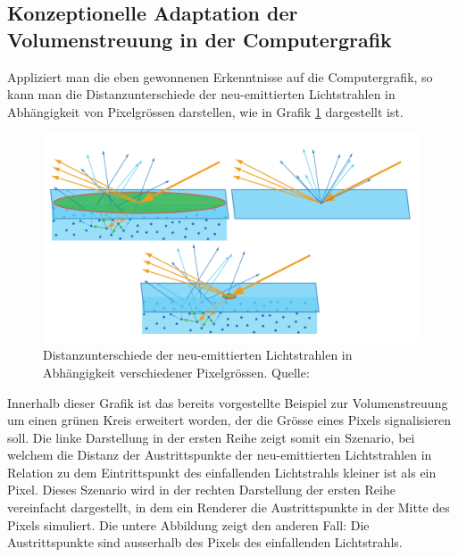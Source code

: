 \documentclass[ngerman,runningheads,a4paper]{llncs}[2018/03/10]
\begin{document}
\subsection{Konzeptionelle Adaptation der Volumenstreuung in der Computergrafik}

Appliziert man die eben gewonnenen Erkenntnisse auf die Computergrafik, so kann man die Distanzunterschiede der neu-emittierten Lichtstrahlen in Abhängigkeit von Pixelgrössen darstellen, wie in Grafik \ref{fig:subsurface-scattering-pixel-considerations} dargestellt ist.

\begin{figure}
  \centering
  \includegraphics[scale=0.2,keepaspectratio]{./images/subsurface-scattering-pixel-considerations.jpg}
  \caption{Distanzunterschiede der neu-emittierten Lichtstrahlen in Abhängigkeit verschiedener Pixelgrössen. Quelle: \cite{real-time-rendering}}
  \label{fig:subsurface-scattering-pixel-considerations}
\end{figure}

Innerhalb dieser Grafik ist das bereits vorgestellte Beispiel zur Volumenstreuung um einen grünen Kreis erweitert worden, der die Grösse eines Pixels signalisieren soll.
Die linke Darstellung in der ersten Reihe zeigt somit ein Szenario, bei welchem die Distanz der Austrittspunkte der neu-emittierten Lichtstrahlen in Relation zu dem Eintrittspunkt des einfallenden Lichtstrahls kleiner ist als ein Pixel.
Dieses Szenario wird in der rechten Darstellung der ersten Reihe  vereinfacht dargestellt, in dem ein Renderer die Austrittspunkte in der Mitte des Pixels simuliert.
Die untere Abbildung zeigt den anderen Fall: Die Austrittspunkte sind ausserhalb des Pixels des einfallenden Lichtstrahls.
\end{document}
